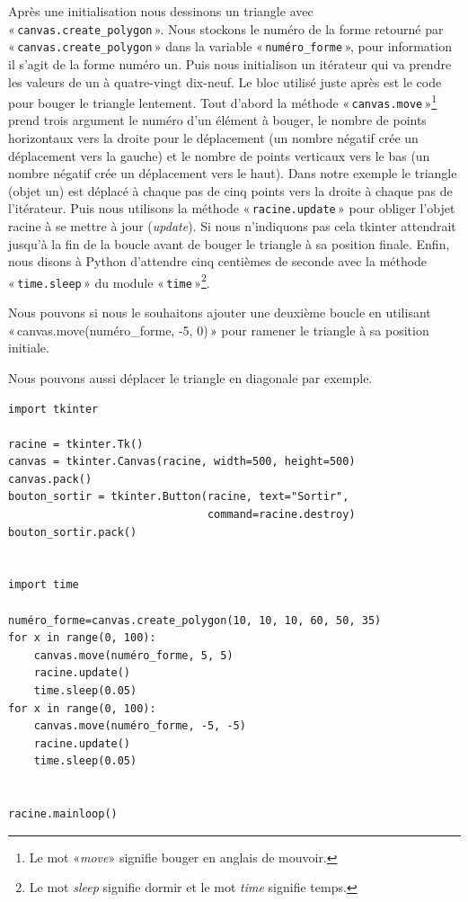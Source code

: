 Après une initialisation nous dessinons un triangle avec « \texttt{canvas.create\_polygon} ». 
Nous stockons le numéro de la forme retourné par « \texttt{canvas.create\_polygon} » dans la variable « \texttt{numéro\_forme} », pour information il s'agit de la forme numéro un.
Puis nous initialison un itérateur qui va prendre les valeurs de un à quatre-vingt dix-neuf. Le bloc utilisé juste après est le code pour bouger le triangle lentement. Tout d'abord la méthode « \texttt{canvas.move} »\footnote{Le mot «\emph{move}» signifie bouger en anglais de mouvoir.}  prend trois argument le numéro d'un élément à bouger, le nombre de points horizontaux vers la droite pour le déplacement (un nombre négatif crée un déplacement vers la gauche) et le nombre de points verticaux vers le bas (un nombre négatif crée un déplacement vers le haut). Dans notre exemple le triangle (objet un) est déplacé à chaque pas de cinq points vers la droite à chaque pas de l'itérateur.  
Puis nous utilisons la méthode « \texttt{racine.update} » pour obliger l'objet racine à se mettre à jour (\emph{update}). Si nous n'indiquons pas cela tkinter attendrait jusqu'à la fin de la boucle avant de bouger le triangle à sa position finale.  Enfin, nous disons à Python d'attendre cinq centièmes de seconde avec la méthode « \texttt{time.sleep} » du module « \texttt{time} »\footnote{Le mot \emph{sleep} signifie dormir et le mot \emph{time} signifie temps.}.

Nous pouvons si nous le souhaitons ajouter une deuxième boucle en utilisant  « canvas.move(numéro\_forme, -5, 0) »  pour ramener le triangle à sa position initiale.


Nous pouvons aussi déplacer le triangle en diagonale par exemple.

\begin{Verbatim}[frame=single,rulecolor=\color{mbleu}, label=à taper]
import tkinter

racine = tkinter.Tk()
canvas = tkinter.Canvas(racine, width=500, height=500)
canvas.pack()
bouton_sortir = tkinter.Button(racine, text="Sortir",
                               command=racine.destroy)
bouton_sortir.pack()


import time

numéro_forme=canvas.create_polygon(10, 10, 10, 60, 50, 35)
for x in range(0, 100):
    canvas.move(numéro_forme, 5, 5)
    racine.update()
    time.sleep(0.05)
for x in range(0, 100):
    canvas.move(numéro_forme, -5, -5)
    racine.update()
    time.sleep(0.05)


racine.mainloop()
\end{Verbatim}

